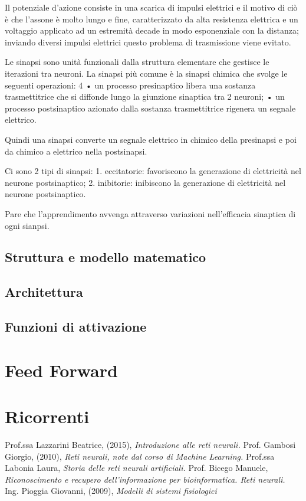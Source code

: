 \documentclass[12pt,a4paper,oneside]{book}
\begin{document}
		Il potenziale d'azione consiste in una scarica di impulsi elettrici e il motivo di ciò è che l'assone è molto lungo e fine, caratterizzato da alta resistenza elettrica e un voltaggio applicato ad un estremità decade in modo esponenziale con la distanza; inviando diversi impulsi elettrici questo problema di trasmissione viene evitato. 
		
		Le sinapsi sono unità funzionali dalla struttura elementare che gestisce le iterazioni tra neuroni. La sinapsi più comune è la sinapsi chimica che svolge le seguenti operazioni: 
		4
		• un processo presinaptico libera una sostanza trasmettitrice che si diffonde lungo la giunzione sinaptica tra 2 neuroni; • un processo postsinaptico azionato dalla sostanza trasmettitrice rigenera un segnale elettrico. 
		
		Quindi una sinapsi converte un segnale elettrico in chimico della presinapsi e poi da chimico a elettrico nella postsinapsi. 
		
		Ci sono 2 tipi di sinapsi: 1. eccitatorie: favoriscono la generazione di elettricità nel neurone postsinaptico; 2. inibitorie: inibiscono la generazione di elettricità nel neurone postsinaptico. 
		
		Pare che l'apprendimento avvenga attraverso variazioni nell'efficacia sinaptica di ogni sianpsi. 
		
		
		
		\section{Struttura e modello matematico}
		\section{Architettura}
		\section{Funzioni di attivazione}
	
	\chapter{Feed Forward}
	\chapter{Ricorrenti}

\clearpage 
{}
\begin{thebibliography}{9} 
	 Prof.ssa Lazzarini Beatrice, (2015), \emph{Introduzione alle reti neurali.}
	 Prof. Gambosi Giorgio, (2010), \emph{Reti neurali, note dal corso di Machine Learning.}
	 Prof.ssa Labonia Laura, \emph{Storia delle reti neurali artificiali.}
	 Prof. Bicego Manuele, \emph{Riconoscimento e recupero dell’informazione per bioinformatica. Reti neurali.}
	 Ing. Pioggia Giovanni, (2009), \emph{Modelli di sistemi fisiologici}
 \end{thebibliography}
	
\end{document}
